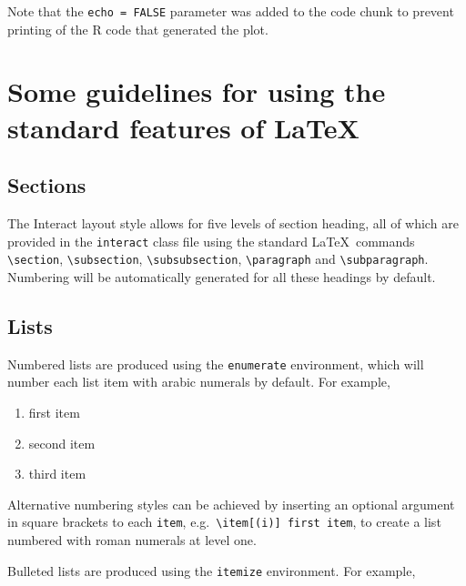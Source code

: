 \documentclass[]{interact}
\theoremstyle{plain}%
\theoremstyle{definition}
\theoremstyle{remark}
\def\tightlist{}
\begin{document}
Note that the \texttt{echo\ =\ FALSE} parameter was added to the code
chunk to prevent printing of the R code that generated the plot.

\hypertarget{some-guidelines-for-using-the-standard-features-of}{%
\section{\texorpdfstring{Some guidelines for using the standard features
of
\LaTeX}{Some guidelines for using the standard features of }}\label{some-guidelines-for-using-the-standard-features-of}}

\hypertarget{sections}{%
\subsection{Sections}\label{sections}}

The \textsf{Interact} layout style allows for five levels of section
heading, all of which are provided in the \texttt{interact} class file
using the standard \LaTeX~commands \texttt{\textbackslash{}section},
\texttt{\textbackslash{}subsection},
\texttt{\textbackslash{}subsubsection},
\texttt{\textbackslash{}paragraph} and
\texttt{\textbackslash{}subparagraph}. Numbering will be automatically
generated for all these headings by default.

\hypertarget{lists}{%
\subsection{Lists}\label{lists}}

Numbered lists are produced using the \texttt{enumerate} environment,
which will number each list item with arabic numerals by default. For
example,

\begin{enumerate}
\def\labelenumi{\arabic{enumi}.}
\tightlist
\item
  first item
\item
  second item
\item
  third item
\end{enumerate}

Alternative numbering styles can be achieved by inserting an optional
argument in square brackets to each \texttt{item},
e.g.~\texttt{\textbackslash{}item{[}(i){]}\ first\ item}, to create a
list numbered with roman numerals at level one.

Bulleted lists are produced using the \texttt{itemize} environment. For
example,
\end{document}
